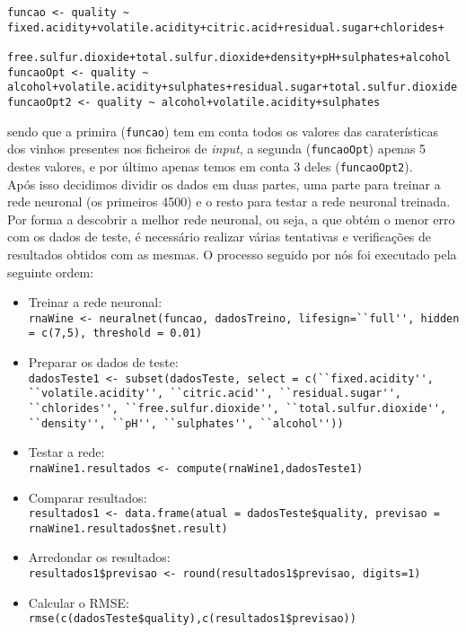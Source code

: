 \documentclass{article}
\begin{document}
\begin{verbatim}
funcao <- quality ~ fixed.acidity+volatile.acidity+citric.acid+residual.sugar+chlorides+
                    free.sulfur.dioxide+total.sulfur.dioxide+density+pH+sulphates+alcohol
funcaoOpt <- quality ~ alcohol+volatile.acidity+sulphates+residual.sugar+total.sulfur.dioxide
funcaoOpt2 <- quality ~ alcohol+volatile.acidity+sulphates
\end{verbatim}

sendo que a primira (\texttt{funcao}) tem em conta todos os valores das caraterísticas dos vinhos presentes nos ficheiros de \textit{input}, a segunda (\texttt{funcaoOpt}) apenas 5 destes valores, e por último apenas temos em conta 3 deles (\texttt{funcaoOpt2}).\\
Após isso decidimos dividir os dados em duas partes, uma parte para treinar a rede neuronal (os primeiros 4500) e o resto para testar a rede neuronal treinada.
Por forma a descobrir a melhor rede neuronal, ou seja, a que obtém o menor erro com os dados de teste, é necessário realizar várias tentativas e verificações de resultados obtidos com as mesmas. O processo seguido por nós foi executado pela seguinte ordem:

\begin{itemize}
    \item Treinar a rede neuronal:\\
        \verb|rnaWine <- neuralnet(funcao, dadosTreino, lifesign=``full'', hidden = c(7,5), threshold = 0.01)|
    \item Preparar os dados de teste:\\ 
        \verb|dadosTeste1 <- subset(dadosTeste, select = c(``fixed.acidity'', ``volatile.acidity'', ``citric.acid'', ``residual.sugar'', ``chlorides'', ``free.sulfur.dioxide'', ``total.sulfur.dioxide'', ``density'', ``pH'', ``sulphates'', ``alcohol''))|
    \item Testar a rede:\\
        \verb|rnaWine1.resultados <- compute(rnaWine1,dadosTeste1)|
    \item Comparar resultados:\\
        \verb|resultados1 <- data.frame(atual = dadosTeste$quality, previsao = rnaWine1.resultados$net.result)|
    \item Arredondar os resultados:\\
        \verb|resultados1$previsao <- round(resultados1$previsao, digits=1)|
    \item Calcular o RMSE:\\
        \verb|rmse(c(dadosTeste$quality),c(resultados1$previsao))|
\end{itemize}
\end{document}
